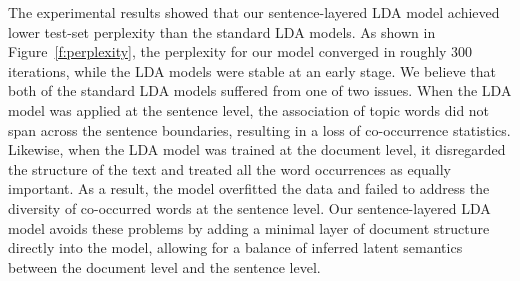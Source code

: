 The experimental results showed that our sentence-layered LDA model achieved
lower test-set perplexity than the standard LDA models.  As shown in
Figure~\ref{f:perplexity}, the perplexity for our model converged in roughly
300 iterations, while the LDA models were stable at an early stage.  We
believe that both of the standard LDA models suffered from one of two issues.
When the LDA model was applied at the sentence level, the association of
topic words did not span across the sentence boundaries, resulting in a loss of
co-occurrence statistics.  Likewise, when the LDA model was trained at the
document level, it disregarded the structure of the text and treated all the
word occurrences as equally important.  As a result, the model overfitted the
data and failed to address the diversity of co-occurred words at the sentence
level.  Our sentence-layered LDA model avoids these problems by adding a
minimal layer of document structure directly into the model, allowing for a
balance of inferred latent semantics between the document level and the
sentence level.

% 
% 
% 

